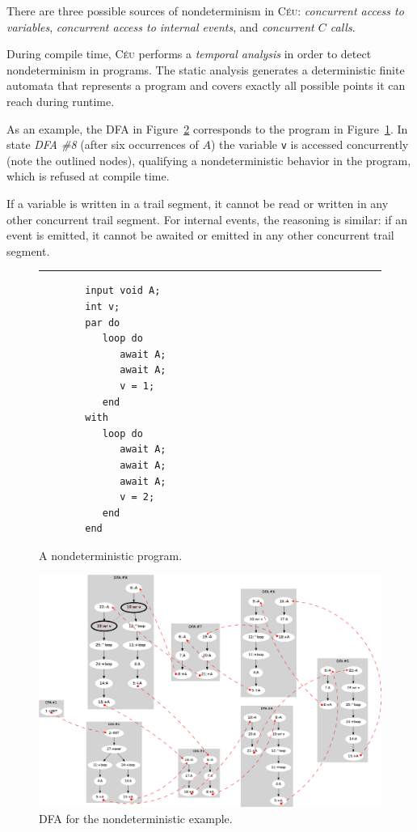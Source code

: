 \documentclass[11pt,a4paper]{article}
\newcommand{\2}{\;\;}
\newcommand{\5}{\;\;\;\;\;}
\newcommand{\CEU}{\textsc{C\'{e}u}}
\newcommand{\code}[1] {{\small{\texttt{#1}}}}
\begin{document}
There are three possible sources of nondeterminism in \CEU:
\emph{concurrent access to variables},
\emph{concurrent access to internal events},
and \emph{concurrent $C$ calls}.

During compile time, \CEU{} performs a \emph{temporal analysis} in order to 
detect nondeterminism in programs.
The static analysis generates a deterministic finite automata that represents a 
program and covers exactly all possible points it can reach during runtime.

As an example, the DFA in Figure~\ref{fig:dfa} corresponds to the program in 
Figure~\ref{lst:ceu:det}.
In state \emph{DFA \#8} (after six occurrences of $A$) the variable \code{v} is 
accessed concurrently (note the outlined nodes), qualifying a nondeterministic 
behavior in the program, which is refused at compile time.


If a variable is written in a trail segment, it cannot be read or written in 
any other concurrent trail segment.
For internal events, the reasoning is similar: if an event is emitted, it 
cannot be awaited or emitted in any other concurrent trail segment.

\newpage

\begin{figure}[h]
\rule{15cm}{0.37pt}
{\small
\begin{verbatim}
        input void A;
        int v;
        par do
           loop do
              await A;
              await A;
              v = 1;
           end
        with
           loop do
              await A;
              await A;
              await A;
              v = 2;
           end
        end
\end{verbatim}
}
\caption{ A nondeterministic program.
\label{lst:ceu:det}
}
\end{figure}

\begin{figure}[h!]
\centering
\includegraphics[scale=0.24]{dfa.png}
\caption{ DFA for the nondeterministic example.
\label{fig:dfa}
}
\end{figure}
\end{document}
